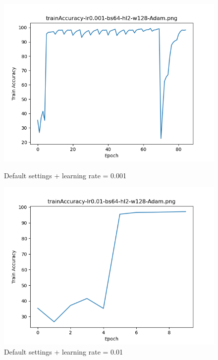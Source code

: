 \documentclass{article}[12pt]
\begin{document}
    \begin{figure}[H]
        \includegraphics[width=\linewidth]{testsResults/trainAccuracy/def.png}
        \caption{Default settings + learning rate = 0.001}
        \endminipage\hfill
        \includegraphics[width=\linewidth]{testsResults/trainAccuracy/trainAccuracy-lr0.01-bs64-hl2-w128-Adam.png}
        \caption{Default settings + learning rate = 0.01}
        \endminipage
    \end{figure}
\end{document}
